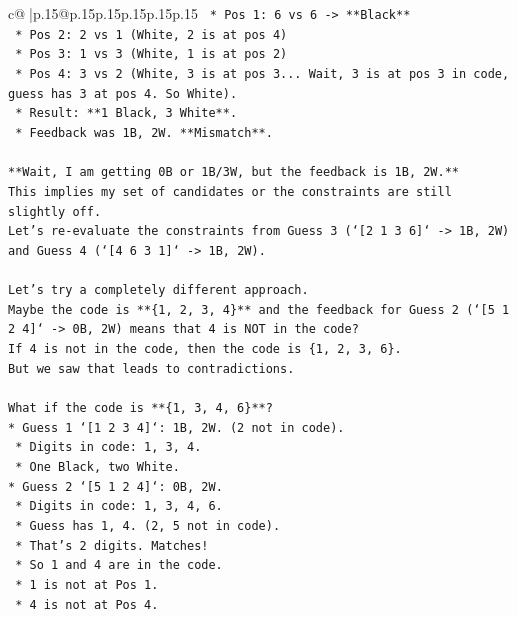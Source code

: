 \documentclass{article}
\begin{document}
{\begin{supertabular}{c@{$\;$}|p{.15\linewidth}@{}p{.15\linewidth}p{.15\linewidth}p{.15\linewidth}p{.15\linewidth}p{.15\linewidth}}
{{{\texttt{    *   Pos 1: 6 vs 6 {-}> **Black**} \\
\texttt{    *   Pos 2: 2 vs 1 (White, 2 is at pos 4)} \\
\texttt{    *   Pos 3: 1 vs 3 (White, 1 is at pos 2)} \\
\texttt{    *   Pos 4: 3 vs 2 (White, 3 is at pos 3... Wait, 3 is at pos 3 in code, guess has 3 at pos 4. So White).} \\
\texttt{    *   Result: **1 Black, 3 White**.} \\
\texttt{    *   Feedback was 1B, 2W. **Mismatch**.} \\
\\ 
\texttt{**Wait, I am getting 0B or 1B/3W, but the feedback is 1B, 2W.**} \\
\texttt{This implies my set of candidates or the constraints are still slightly off.} \\
\texttt{Let's re{-}evaluate the constraints from Guess 3 (`{[}2 1 3 6{]}` {-}> 1B, 2W) and Guess 4 (`{[}4 6 3 1{]}` {-}> 1B, 2W).} \\
\\ 
\texttt{Let's try a completely different approach.} \\
\texttt{Maybe the code is **\{1, 2, 3, 4\}** and the feedback for Guess 2 (`{[}5 1 2 4{]}` {-}> 0B, 2W) means that 4 is NOT in the code?} \\
\texttt{If 4 is not in the code, then the code is \{1, 2, 3, 6\}.} \\
\texttt{But we saw that leads to contradictions.} \\
\\ 
\texttt{What if the code is **\{1, 3, 4, 6\}**?} \\
\texttt{*   Guess 1 `{[}1 2 3 4{]}`: 1B, 2W. (2 not in code).} \\
\texttt{    *   Digits in code: 1, 3, 4.} \\
\texttt{    *   One Black, two White.} \\
\texttt{*   Guess 2 `{[}5 1 2 4{]}`: 0B, 2W.} \\
\texttt{    *   Digits in code: 1, 3, 4, 6.} \\
\texttt{    *   Guess has 1, 4. (2, 5 not in code).} \\
\texttt{    *   That's 2 digits. Matches!} \\
\texttt{    *   So 1 and 4 are in the code.} \\
\texttt{    *   1 is not at Pos 1.} \\
\texttt{    *   4 is not at Pos 4.} \\
}}}
\end{supertabular}}
\end{document}
